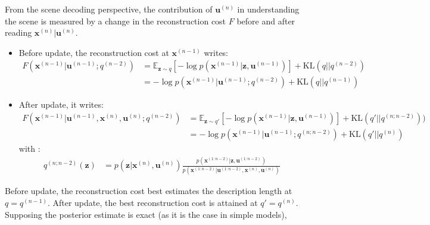 \documentclass[12pt,twoside,openright]{article}
\begin{document}
From the scene decoding perspective, the contribution of $\boldsymbol{u}^{(n)}$ in understanding the scene is measured by a change in the reconstruction cost $F$ before and after reading $\boldsymbol{x}^{(n)}|\boldsymbol{u}^{(n)}$.
\begin{itemize}
	\item Before update, the reconstruction cost at $\boldsymbol{x}^{(n-1)}$ writes:
	\begin{align}
	F(\boldsymbol{x}^{(n-1)}|\boldsymbol{u}^{(n-1)}; q^{(n-2)}) 
	&= \mathbb{E}_{\boldsymbol{z} \sim q} \left[-\log p(\boldsymbol{x}^{(n-1)}| \boldsymbol{z}, \boldsymbol{u}^{(n-1)} )
	\right] + \text{KL}(q||q^{(n-2)}) \\
	&= -\log p(\boldsymbol{x}^{(n-1)}|\boldsymbol{u}^{(n-1)}; q^{(n-2)}) + \text{KL} (q||q^{(n-1)})
	\end{align}
	\item After update, it writes:
	\begin{align}
	F(\boldsymbol{x}^{(n-1)}|\boldsymbol{u}^{(n-1)},\boldsymbol{x}^{(n)},\boldsymbol{u}^{(n)}; q^{(n-2)}) 
	&= \mathbb{E}_{\boldsymbol{z} \sim q'} \left[-\log p(\boldsymbol{x}^{(n-1)}| \boldsymbol{z}, \boldsymbol{u}^{(n-1)} )
	\right] + \text{KL}(q'||q^{(n;n-2)})) \\
	&= -\log p(\boldsymbol{x}^{(n-1)}|\boldsymbol{u}^{(n-1)}; q^{(n;n-2)}) + \text{KL} (q'||q^{(n)})
	\end{align}
	with :
	\begin{align}
	q^{(n; n-2)}(\boldsymbol{z}) &= p(\boldsymbol{z}|\boldsymbol{x}^{(n)}, \boldsymbol{u}^{(n)})\frac{p(\boldsymbol{x}^{(1:n-2)}|\boldsymbol{z}, \boldsymbol{u}^{(1:n-2)})}{p(\boldsymbol{x}^{(1:n-2)}|\boldsymbol{u}^{(1:n-2)}, \boldsymbol{x}^{(n)}, \boldsymbol{u}^{(n)})} 
	\end{align}
\end{itemize}

Before update, the reconstruction cost best estimates the description length at $q = q^{(n-1)}$. After update, the best reconstruction cost is attained at $q' =  q^{(n)}$. Supposing the posterior estimate is exact (as it is the case in simple models),  
\end{document}
